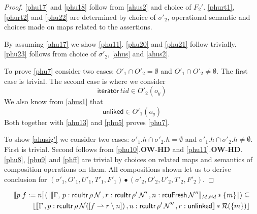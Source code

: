 \begin{proof}
\ref{phu17} and \ref{phu18} follow from \ref{ahus2} and choice of $F_2'$. \ref{phurt1}, \ref{phurt2} and \ref{phu22} are determined by choice of $\sigma'_2$, operational semantic and choices made on maps related to the assertions.

By assuming \ref{ahu17} we show \ref{phu11}. \ref{phu20} and \ref{phu21} follow trivially. \ref{phu23} follows from choice of $\sigma'_2$, \ref{ahus} and \ref{ahus2}. 

To prove \ref{phu7} consider two cases: $O'_1 \cap O'_2 = \emptyset$ and $O'_1 \cap O'_2 \neq \emptyset$. The first case is trivial. The second case is where we consider 
\[
\textsf{iterator}\,tid \in O'_2(o_y)
\]
We also know from \ref{ahus1} that
\[\textsf{unliked} \in O'_1(o_y)\]
Both together with \ref{ahu13} and \ref{phu5} proves \ref{phu7}.

To show \ref{ahusig'} we consider two cases: $\sigma'_1.h \cap \sigma'_2.h = \emptyset$ and $\sigma'_1.h \cap \sigma'_2.h \neq \emptyset$. First is trivial. Second follows from \ref{phu10}.\textbf{OW}-\textbf{HD} and \ref{phu11}.\textbf{OW}-\textbf{HD}. \ref{phu8}, \ref{phu9} and \ref{phff} are trivial by choices on related maps and semantics of composition operations on them. All compositions shown let us to derive conclusion for $(\sigma'_1, O'_1, U'_1, T'_1,F'_1) \bullet (\sigma'_2, O'_2, U'_2, T'_2,F'_2) $.
   \end{proof}
 \begin{lemma}
   \label{lemma:linkf}
   \begin{align*}
  \llbracket p.f := n \rrbracket (\lfloor \llbracket \Gamma,\,
 p:\textsf{rcuItr}\, \rho \, \mathcal{N} \, ,
  r:\textsf{rcuItr}\, \rho' \, \mathcal{N}' \, , n:\textsf{rcuFresh} \, \mathcal{N}''\rrbracket_{M,tid} * \{m\}\rfloor)  \subseteq \\
  \lfloor \llbracket \Gamma \,,p:\textsf{rcuItr}\, \rho \, \mathcal{N}([f \rightharpoonup r \setminus  n]) \, , n:\textsf{rcuItr}\, \rho' \, \mathcal{N}'' \, ,r:\textsf{unlinked} \rrbracket  * \mathcal{R}(\{m\})\rfloor
\end{align*}
 \end{lemma}

